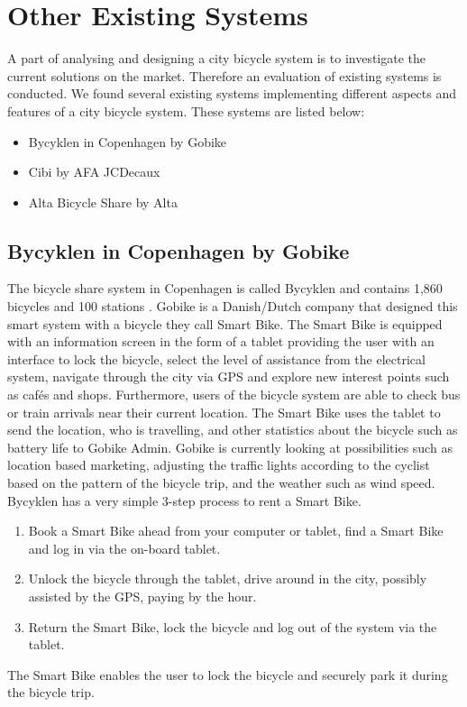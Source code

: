 \section{Other Existing Systems}\label{sec:existing-systems}
A part of analysing and designing a city bicycle system is to investigate the current solutions on the market. 
Therefore an evaluation of existing systems is conducted.
We found several existing systems implementing different aspects and features of a city bicycle system. 
These systems are listed below:
\begin{itemize}
\item Bycyklen in Copenhagen by Gobike
\item Cibi by AFA JCDecaux
\item Alta Bicycle Share by Alta
\end{itemize}
\subsection{Bycyklen in Copenhagen by Gobike}
The bicycle share system in Copenhagen is called Bycyklen and contains 1,860 bicycles and 100 stations \citep{misc:bycyklen}. 
Gobike is a Danish/Dutch company that designed this smart system with a bicycle they call Smart Bike. 
The Smart Bike is equipped with an information screen in the form of a tablet providing the user with an interface to lock the bicycle, select the level of assistance from the electrical system, navigate through the city via GPS and explore new interest points such as cafés and shops.
Furthermore, users of the bicycle system are able to check bus or train arrivals near their current location.
The Smart Bike uses the tablet to send the location, who is travelling, and other statistics about the bicycle such as battery life to Gobike Admin.
Gobike is currently looking at possibilities such as location based marketing, adjusting the traffic lights according to the cyclist based on the pattern of the bicycle trip, and the weather such as wind speed.
Bycyklen has a very simple 3-step process to rent a Smart Bike.
\begin{enumerate}
\item Book a Smart Bike ahead from your computer or tablet, find a Smart Bike and log in via the on-board tablet.
\item Unlock the bicycle through the tablet, drive around in the city, possibly assisted by the GPS, paying by the hour.
\item Return the Smart Bike, lock the bicycle and log out of the system via the tablet.
\end{enumerate}
The Smart Bike enables the user to lock the bicycle and securely park it during the bicycle trip.

